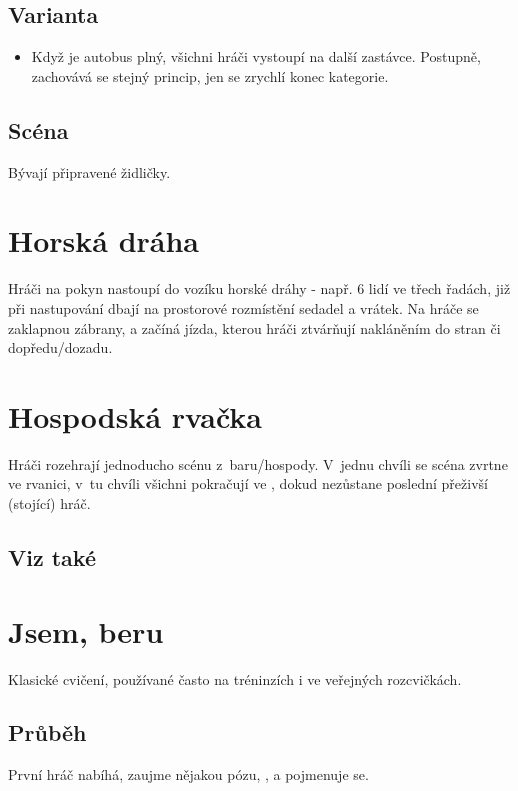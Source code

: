 \subsection{Varianta} \begin{itemize}
\item Když je autobus plný, všichni hráči vystoupí na další zastávce. Postupně, zachovává se stejný princip, jen se zrychlí konec kategorie.
\end{itemize}
 
\subsection{Scéna} Bývají připravené židličky. 
 
 
\needspace{5cm} \section{Horská dráha} \label{horská dráha} Hráči na pokyn nastoupí do vozíku horské dráhy - např. 6 lidí ve třech řadách, 
již při nastupování dbají na prostorové rozmístění sedadel a vrátek. 
Na hráče se zaklapnou zábrany, a začíná jízda, kterou hráči ztvárňují nakláněním do stran či dopředu/dozadu. 
 
\needspace{5cm} \section{Hospodská rvačka} \label{hospodská rvačka} Hráči rozehrají jednoducho scénu z~baru/hospody. V~jednu chvíli se scéna zvrtne ve rvanici, v~tu chvíli všichni pokračují ve , dokud nezůstane poslední přeživší (stojící) hráč. 
 
\subsection{Viz také}  
 
 
\needspace{5cm} \section{Jsem, beru} \label{jsem, beru} Klasické cvičení, používané často na tréninzích i ve veřejných rozcvičkách. 
\subsection{Průběh} První hráč nabíhá, zaujme nějakou pózu,  , a pojmenuje se. 
 
